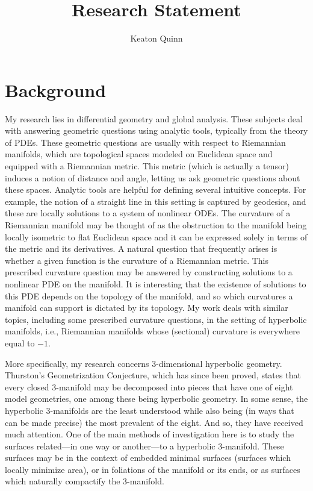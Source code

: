 \documentclass[11pt]{amsart}
\begin{document}
\title{Research Statement}

\author{Keaton Quinn}


\maketitle

\vspace{-9mm}
\section{Background}

My research lies in differential geometry and global analysis. 
These subjects deal with answering geometric questions using analytic tools, typically from the theory of PDEs. 
These geometric questions are usually with respect to Riemannian manifolds, which are topological spaces modeled on Euclidean space and equipped with a Riemannian metric. 
This metric (which is actually a tensor) induces a notion of distance and angle, letting us ask geometric questions about these spaces. 
Analytic tools are helpful for defining several intuitive concepts. 
For example, the notion of a straight line in this setting is captured by geodesics, and these are locally solutions to a system of nonlinear ODEs. 
The curvature of a Riemannian manifold may be thought of as the obstruction to the manifold being locally isometric to flat Euclidean space and it can be expressed solely in terms of the metric and its derivatives. 
A natural question that frequently arises is whether a given function is the curvature of a Riemannian metric. 
This prescribed curvature question may be answered by constructing solutions to a nonlinear PDE on the manifold. 
It is interesting that the existence of solutions to this PDE depends on the topology of the manifold, and so which curvatures a manifold can support is dictated by its topology. 
My work deals with similar topics, including some prescribed curvature questions, in the setting of hyperbolic manifolds, i.e., Riemannian manifolds whose (sectional) curvature is everywhere equal to $-1$. 

More specifically, my research concerns 3-dimensional hyperbolic geometry.
Thurston's Geometrization Conjecture, which has since been proved, states that every closed 3-manifold may be decomposed into pieces that have one of eight model geometries, one among these being hyperbolic geometry. 
In some sense, the hyperbolic 3-manifolds are the least understood while also being (in ways that can be made precise) the most prevalent of the eight. 
And so, they have received much attention. 
One of the main methods of investigation here is to study the surfaces related---in one way or another---to a hyperbolic 3-manifold. 
These surfaces may be in the context of embedded minimal surfaces (surfaces which locally minimize area), or in foliations of the manifold or its ends, or as surfaces which naturally compactify the 3-manifold. 
\end{document}
